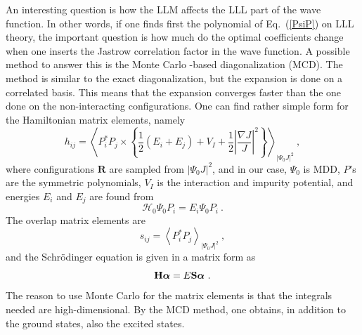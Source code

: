 \documentclass{article}
\begin{document}
An interesting question is how the LLM affects the LLL part of the
wave function. In other words, if one finds first the polynomial of
Eq.~(\ref{PsiP}) on LLL theory, the important question is how much do
the optimal coefficients change when one inserts the Jastrow
correlation factor in the wave function. A possible method to answer
this is the Monte Carlo -based diagonalization (MCD)\cite{MCD}. The
method is similar to the exact diagonalization, but the expansion is
done on a correlated basis. This means that the expansion converges
faster than the one done on the non-interacting configurations. One
can find rather simple form for the Hamiltonian matrix elements,
namely
\begin{equation}
h_{ij}=\left \langle P_i^*P_j \times 
\left\{ \frac 12 (E_i + E_j) + V_I 
+ \frac 12 \left|\frac{\nabla J}{J}\right|^2
\right\}
\right \rangle_{|\Psi_0 J|^2} \ ,
\end{equation}
where configurations $\mathbf{R}$ are sampled from $|\Psi_0 J|^2$, and
in our case, $\Psi_0$ is MDD, $P$'s are the symmetric polynomials,
$V_I$ is the interaction and impurity potential, and energies $E_i$
and $E_j$ are found from
\begin{equation}
\mathcal{H}_0 \Psi_0 P_i =  E_i \Psi_0 P_i \ .
\end{equation}
The overlap matrix elements are 
\begin{equation}
s_{ij}=\left \langle P_i^*P_j
\right \rangle_{|\Psi_0 J|^2} \ ,
\end{equation}
and the Schr\"odinger equation is given in a matrix form as
\begin{equation}
\mathbf{H}\mbox{\boldmath $\alpha$}=E \mathbf{S} \mbox{\boldmath
  $\alpha$} \ .
\end{equation}
%
The reason to use Monte Carlo for the matrix elements is that the
integrals needed are high-dimensional. By the MCD method, one obtains,
in addition to the ground states, also the excited states.
\end{document}
